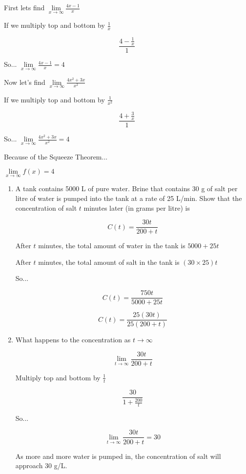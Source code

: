\documentclass{article}
\begin{document}
\begin{enumerate}
			First lets find $\lim \limits _{x \to \infty} \frac{4x - 1}{x}$

			If we multiply top and bottom by $\frac{1}{x}$

			$$\frac{4 - \frac{1}{x}}{1}$$

			So... $\lim \limits _{x \to \infty} \frac{4x - 1}{x} = 4$

			Now let's find $\lim \limits _{x \to \infty} \frac{4x^2 + 3x}{x^2}$

			If we multiply top and bottom by $\frac{1}{x^2}$

			$$\frac{4 + \frac{3}{x}}{1}$$

			So... $\lim \limits _{x \to \infty} \frac{4x^2 + 3x}{x^2} = 4$

			Because of the Squeeze Theorem...

			$\lim \limits _{x \to \infty} f(x) = 4$


		\begin{enumerate}
			\item A tank contains 5000 L of pure water. Brine that 
				contains 30 g of salt per litre of water is pumped
				into the tank at a rate of 25 L/min. Show that the
				concentration of salt $t$ minutes later (in grams
				per litre) is 

				$$C(t) = \frac{30t}{200 + t}$$

				After $t$ minutes, the total amount of water in the
				tank is $5000 + 25t$

				After $t$ minutes, the total amount of salt in the tank
				is $(30 \times 25)t$

				So... 

				$$C(t) = \frac{750t}{5000 + 25t}$$

				$$C(t) = \frac{25(30t)}{25(200 + t)}$$

			\item What happens to the concentration as $t \to \infty$

				$$\lim \limits _{t \to \infty} \frac{30t}{200 + t}$$

				Multiply top and bottom by $\frac{1}{t}$

				$$\frac{30}{1 + \frac{200}{t}}$$

				So...

				$$\lim \limits _{t \to \infty} \frac{30t}{200 + t} = 30$$

				As more and more water is pumped in, the concentration of
				salt will approach 30 g/L.
		\end{enumerate}


\end{enumerate}
\end{document}
